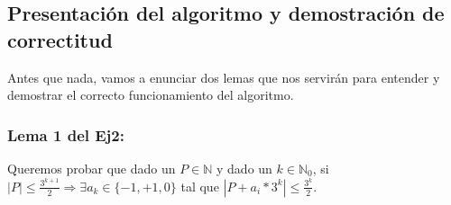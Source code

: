 \subsection{Presentación del algoritmo y demostración de correctitud}

\par Antes que nada, vamos a enunciar dos lemas que nos servirán para entender y demostrar el correcto funcionamiento del algoritmo.

\subsubsection{Lema 1 del Ej2:}
\label{ssub: lema_ej2_1}

\par Queremos probar que dado un $P \in \mathds{N}$ y dado un $k \in \mathds{N}_0$, si $|P| \leq \frac{3^{k+1}}{2} \Longrightarrow \exists a_k \in \{-1,+1,0\}$ tal que $|P + a_i * 3^{k}| \leq \frac{3^{k}}{2}$.

\bigskip

